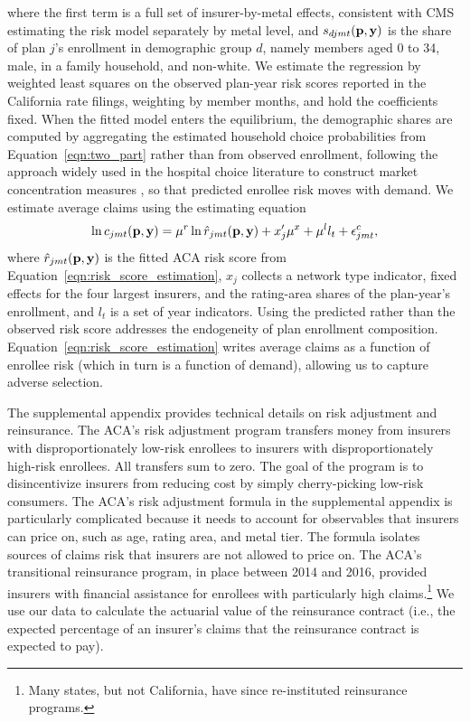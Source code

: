 \documentclass[12pt]{article}
\begin{document}
where the first term is a full set of insurer-by-metal effects, consistent with CMS estimating the risk model separately by metal level, and $s_{djmt}({\bf p},{\bf y})$ is the share of plan $j$'s enrollment in demographic group $d$, namely members aged 0 to 34, male, in a family household, and non-white. We estimate the regression by weighted least squares on the observed plan-year risk scores reported in the California rate filings, weighting by member months, and hold the coefficients fixed. When the fitted model enters the equilibrium, the demographic shares are computed by aggregating the estimated household choice probabilities from Equation~\eqref{eqn:two_part} rather than from observed enrollment, following the approach widely used in the hospital choice literature to construct market concentration measures \citep{kessler2000}, so that predicted enrollee risk moves with demand. We estimate average claims using the estimating equation  
\begin{equation}
\label{eqn:avg_claims_estimation}
	\ln c_{jmt}({\bf p},{\bf y}) = \mu^r \ln \hat{r}_{jmt}({\bf p},{\bf y}) + x'_j  \mu^{x}  + \mu^l l_t + \epsilon_{jmt}^c,
\end{equation}
where $\hat{r}_{jmt}({\bf p},{\bf y})$ is the fitted ACA risk score from Equation~\eqref{eqn:risk_score_estimation}, $x_j$ collects a network type indicator, fixed effects for the four largest insurers, and the rating-area shares of the plan-year's enrollment, and $l_t$ is a set of year indicators. Using the predicted rather than the observed risk score addresses the endogeneity of plan enrollment composition.  Equation~\eqref{eqn:risk_score_estimation} writes average claims as a function of enrollee risk (which in turn is a function of demand), allowing us to capture adverse selection.

The supplemental appendix provides technical details on risk adjustment and reinsurance.  The ACA's risk adjustment program transfers money from insurers with disproportionately low-risk enrollees to insurers with disproportionately high-risk enrollees.  All transfers sum to zero.  The goal of the program is to disincentivize insurers from reducing cost by simply cherry-picking low-risk consumers. The ACA's risk adjustment formula in the supplemental appendix is particularly complicated because it needs to account for observables that insurers can price on, such as age, rating area, and metal tier.  The formula isolates sources of claims risk that insurers are not allowed to price on.  The ACA's transitional reinsurance program, in place between 2014 and 2016, provided insurers with financial assistance for enrollees with particularly high claims.\footnote{Many states, but not California, have since re-instituted reinsurance programs.} We use our data to calculate the actuarial value of the reinsurance contract (i.e., the expected percentage of an insurer's claims that the reinsurance contract is expected to pay).     
\end{document}
